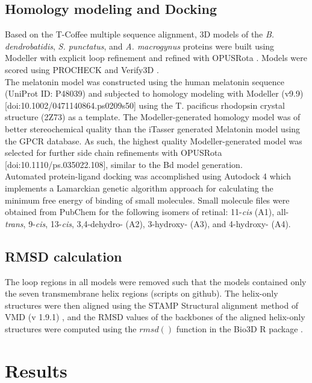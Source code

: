 \subsection{Homology modeling and Docking}
\label{subsec:meth_modeling_docking}
Based on the T-Coffee multiple sequence alignment, 3D models of the \textit{B. dendrobatidis}, \textit{S. punctatus}, and \textit{A. macrogynus} proteins were built using Modeller \cite{Eswar2007} with explicit loop refinement and refined with OPUSRota \cite{Lu2008}. Models were scored using PROCHECK \cite{Laskowski1993,Wiederstein2007} and Verify3D \cite{Luthy1992}.\\
\indent The melatonin model was constructed using the human melatonin sequence (UniProt ID: P48039) and subjected to homology modeling with Modeller (v9.9) [doi:10.1002/0471140864.ps0209s50] using the T. pacificus rhodopsin crystal structure (2Z73) as a template. The Modeller-generated homology model was of better stereochemical quality than the iTasser generated Melatonin model using the GPCR database. As such, the highest quality Modeller-generated model was selected for further side chain refinements with OPUSRota [doi:10.1110/ps.035022.108], similar to the Bd model generation.\\
\indent Automated protein-ligand docking was accomplished using Autodock 4 \cite{Morris2009} which implements a Lamarckian genetic algorithm approach for calculating the minimum free energy of binding of small molecules. Small molecule files were obtained from PubChem \cite{Bolton2008} for the following isomers of retinal: 11-\textit{cis} (A1), all-\textit{trans}, 9-\textit{cis}, 13-\textit{cis}, 3,4-dehydro- (A2), 3-hydroxy- (A3), and 4-hydroxy- (A4).\\
\subsection{RMSD calculation}
The loop regions in all models were removed such that the models contained only the seven transmembrane helix regions (scripts on github). The helix-only structures were then aligned using the STAMP Structural alignment method \cite{Russell2004} of VMD (v 1.9.1) \cite{Humphrey1996}, and the RMSD values of the backbones of the aligned helix-only structures were computed using the $rmsd()$ function in the Bio3D R package \cite{Grant2006}.\\
\section{Results}
